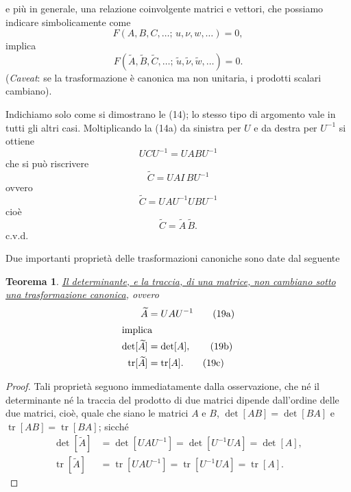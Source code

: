 \documentclass[11pt, a4paper]{book}
\numberwithin{equation}{section}
\newtheorem{teorema}{Teorema}[section]
\begin{document}
e più in generale, una relazione coinvolgente matrici e vettori, che
possiamo indicare simbolicamente come
\begin{equation}
F(A, B, C, \ldots;\, u, \nu, w, \ldots) = 0, \tag{17a}
\end{equation}
implica
\begin{equation}
F(\widetilde{A}, \widetilde{B}, \widetilde{C}, \ldots;\,
  \widetilde{u}, \widetilde{\nu}, \widetilde{w}, \ldots) = 0.
\tag{17b}
\end{equation}
(\emph{Caveat}: se la trasformazione è canonica ma non unitaria, i prodotti
scalari cambiano).

Indichiamo solo come si dimostrano le (14); lo stesso tipo di argomento
vale in tutti gli altri casi. Moltiplicando la (14a) da sinistra per $U$ e
da destra per $U^{-1}$ si ottiene
\[
UCU^{-1} = UABU^{-1}
\]
che si può riscrivere
\[
\widetilde{C} = UAI\,BU^{-1}
\]
ovvero
\[
\widetilde{C} = UAU^{-1}UBU^{-1}
\]
cioè
\[
\widetilde{C} = \widetilde{A}\,\widetilde{B}.
\]
c.v.d.

Due importanti proprietà delle trasformazioni canoniche sono date dal
seguente

\begin{teorema}
\uline{Il determinante, e la traccia, di una matrice, non cambiano sotto
una trasformazione canonica}, ovvero
\begin{align}
\widetilde{A} &= UAU^{-1} \tag{19a} \\
\shortintertext{implica}
\det[\widetilde{A}] &= \det[A], \tag{19b} \\
\operatorname{tr}[\widetilde{A}] &= \operatorname{tr}[A]. \tag{19c}
\end{align}
\end{teorema}

\begin{proof}
Tali proprietà seguono immediatamente dalla osservazione, che né il
determinante né la traccia del prodotto di due matrici dipende
dall'ordine delle due matrici, cioè, quale che siano le matrici $A$ e
$B$, $\det[AB] = \det[BA]$ e $\operatorname{tr}[AB] =
\operatorname{tr}[BA]$; sicché
\begin{align*}
\det[\widetilde{A}] &= \det[UAU^{-1}] = \det[U^{-1}UA] = \det[A], \\
\operatorname{tr}[\widetilde{A}] &= \operatorname{tr}[UAU^{-1}]
  = \operatorname{tr}[U^{-1}UA] = \operatorname{tr}[A].
\end{align*}
\end{proof}

\end{document}
